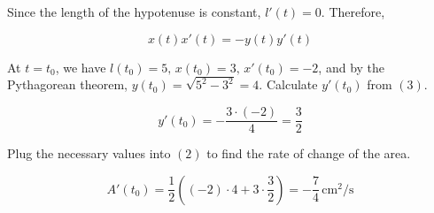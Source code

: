 \documentclass{article}
\begin{document}
\hfill

\noindent Since the length of the hypotenuse is constant, $l'(t) = 0$. Therefore,

\begin{equation}x(t)x'(t)=-y(t)y'(t)\end{equation}

\hfill

\noindent At $t=t_0$, we have $l(t_0) = 5,\,x(t_0)=3,\,x'(t_0)=-2$, and by the Pythagorean theorem, $y(t_0)=\sqrt{5^2-3^2}=4$. Calculate $y'(t_0)$ from $(3)$.

\begin{equation*}
y'(t_0)=-\frac{3\cdot (-2)}4 = \frac32
\end{equation*}

\hfill

\noindent Plug the necessary values into $(2)$ to find the rate of change of the area.

\begin{equation*}
A'(t_0) =\frac12\left((-2)\cdot4+3\cdot\frac32\right)=\boxed{-\frac74\,\text{cm}^2/\text{s}}
\end{equation*}
\end{document}
